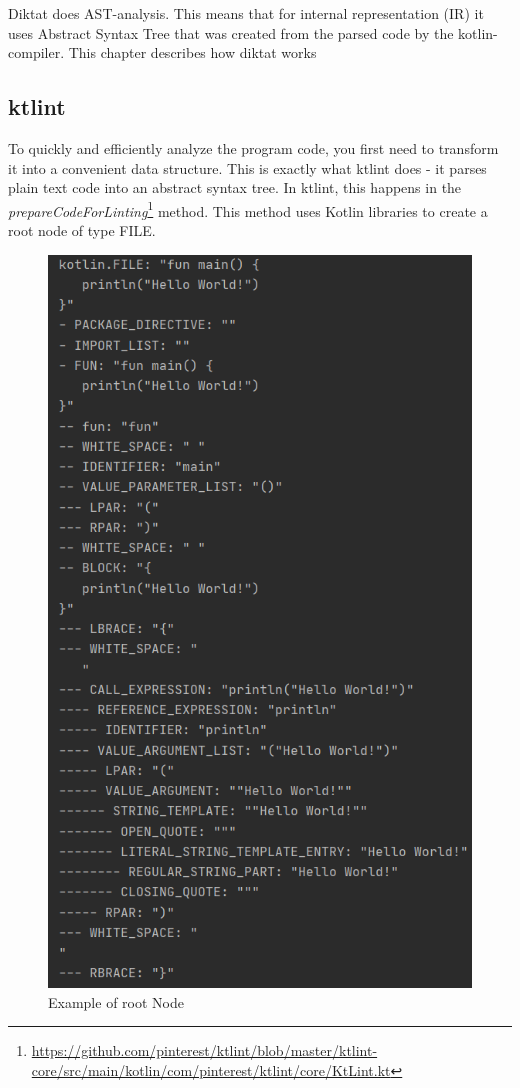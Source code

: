 Diktat does AST-analysis. This means that for internal representation (IR) it uses Abstract Syntax Tree that was created from the parsed code by the kotlin-compiler.  This chapter describes how diktat works

\subsection{ktlint}
\par
To quickly and efficiently analyze the program code, you first need to transform it into a convenient data structure. This is exactly what ktlint does - it parses plain text code into an abstract syntax tree. In ktlint, this happens in the \textsl{prepareCodeForLinting}\footnote{\url{https://github.com/pinterest/ktlint/blob/master/ktlint-core/src/main/kotlin/com/pinterest/ktlint/core/KtLint.kt}} method. This method uses Kotlin libraries to create a root node of type FILE.

\begin{figure}[H]
  \centering
  \includegraphics[scale=0.5]{wp/pictures/fileNode.PNG}
  \caption{Example of root Node}   
\end{figure} 

